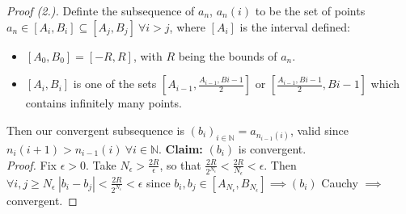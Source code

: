 \begin{proof}[Proof (2.)]
	Definte the subsequence of $a_n$, $a_n(i)$ to be the set of points $a_n \in [A_i,B_i] \subseteq [A_j,B_j]~ \forall i > j$, where $[A_i]$ is the interval defined: \begin{itemize}
 \item$[A_0,B_0] = [-R,R]$, with $R$ being the bounds of $a_n$.
 \item	$[A_i,B_i]$ is one of the sets $[A_{i-1},\frac{A_{i-1},B{i-1}}{2}]$ or $[\frac{A_{i-1},B{i-1}}{2},B{i-1}]$ which contains infinitely many points. 
 \end{itemize}
 Then our convergent subsequence is $(b_{i})_{i \in \mathbb{N}}= a_{n_{i-1}(i)}$, valid since $n_{i}(i+1) > n_{i-1}(i)~ \forall i \in \mathbb{N}$. \textbf{Claim:} $(b_i)$ is convergent.\\
 
  \textit{Proof.} Fix $\epsilon >0$. Take $N_{\epsilon} > \frac{2R}{\epsilon}$, so that $\frac{2R}{2^{N_{\epsilon}}} < \frac{2R}{N_{\epsilon}} < \epsilon$. Then $\forall i, j \geq N_{\epsilon}~ |b_i - b_j| < \frac{2R}{2^{N_{\epsilon}}} < \epsilon$ since $b_i,b_j \in [A_{N_{\epsilon}},B_{N_{\epsilon}}] \implies (b_i)$ Cauchy $\implies$ convergent.
	\end{proof}\vspace*{5pt}
	


